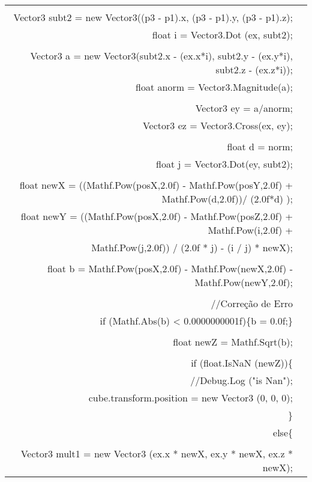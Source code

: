 \begin{longtable}{Rp{15cm}}
\\
\\
\quad \quad	Vector3 subt2 = new Vector3((p3 - p1).x, (p3 - p1).y, (p3 - p1).z);
\\        
\quad \quad	float i = Vector3.Dot (ex, subt2);
\\
\\
\quad \quad	 Vector3 a = new Vector3(subt2.x - (ex.x*i), subt2.y - (ex.y*i), subt2.z - (ex.z*i));
\\        
\quad \quad float anorm = Vector3.Magnitude(a);
\\
\\
\quad \quad Vector3 ey = a/anorm;
\\        
\quad \quad Vector3 ez = Vector3.Cross(ex, ey);
\\
\\
\quad \quad float d = norm;
\\        
\quad \quad float j = Vector3.Dot(ey, subt2);
\\
\\
\quad \quad float newX = ((Mathf.Pow(posX,2.0f) - Mathf.Pow(posY,2.0f) + Mathf.Pow(d,2.0f))/ (2.0f*d) );
\\
\quad \quad	float newY = ((Mathf.Pow(posX,2.0f) - Mathf.Pow(posZ,2.0f) + Mathf.Pow(i,2.0f) +
\\ \quad \quad Mathf.Pow(j,2.0f)) / (2.0f * j) - (i / j) * newX);
\\
\\
\quad \quad float b = Mathf.Pow(posX,2.0f) - Mathf.Pow(newX,2.0f) - Mathf.Pow(newY,2.0f);
\\
\\
\quad \quad //Correção de Erro
\\
\quad \quad if (Mathf.Abs(b) < 0.0000000001f)\{b = 0.0f;\}
\\
\\
\quad \quad float newZ = Mathf.Sqrt(b);
\\
\\
\quad \quad if (float.IsNaN (newZ))\{
\\        
\quad \quad //Debug.Log ("is Nan");
\\            
\quad \quad cube.transform.position = new Vector3 (0, 0, 0);
\\            
\quad \quad \}
\\        
\quad \quad else\{
\\
\\
\quad \quad \quad Vector3 mult1 = new Vector3 (ex.x * newX, ex.y * newX, ex.z * newX);
\\            

\end{longtable}
